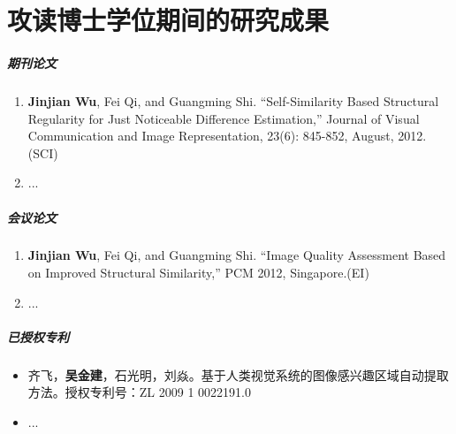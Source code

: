 
\chapter*{攻读博士学位期间的研究成果}
\label{char:achi}
\makeatletter{}\makeatother


\paragraph{期刊论文}

\begin{enumerate}
\item \textbf{Jinjian Wu}, Fei Qi, and Guangming Shi. “Self-Similarity Based Structural Regularity for Just Noticeable Difference Estimation,” Journal of Visual Communication and Image Representation, 23(6): 845-852, August, 2012.(SCI)

\item ...
\end{enumerate}

\paragraph{会议论文}
\begin{enumerate}
\item \textbf{Jinjian Wu}, Fei Qi, and Guangming Shi. “Image Quality Assessment Based on Improved Structural Similarity,” PCM 2012, Singapore.(EI)

\item ...
\end{enumerate}


\paragraph{已授权专利}

\begin{itemize}
\item
齐飞，\textbf{吴金建}，石光明，刘焱。基于人类视觉系统的图像感兴趣区域自动提取方法。授权专利号：ZL 2009 1 0022191.0

\item...
\end{itemize}

